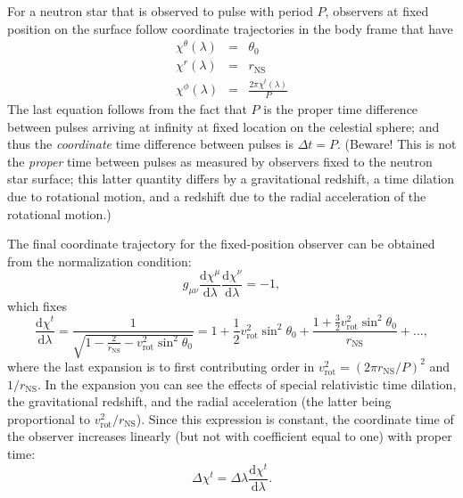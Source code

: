\documentclass[modern]{aastex631}
\newcommand{\dd}{\mathrm{d}}
\newcommand{\rNS}{r_\mathrm{NS}}
\newcommand{\vRot}{v_\mathrm{rot}}
\begin{document}
For a neutron star that is observed to pulse with period $P$, observers at fixed
position on the surface follow coordinate trajectories in the body frame that
have 
\begin{eqnarray}
    \chi^\theta\left( \lambda \right) & = & \theta_0 \\
    \chi^r\left( \lambda \right) & = & \rNS \\
    \chi^\phi\left(\lambda \right) & = & \frac{2 \pi \chi^t\left(\lambda \right)}{P}
\end{eqnarray}
The last equation follows from the fact that $P$ is the proper time difference
between pulses arriving at infinity at fixed location on the celestial sphere;
and thus the \emph{coordinate} time difference between pulses is $\Delta t = P$.
(Beware!  This is not the \emph{proper} time between pulses as measured by
observers fixed to the neutron star surface; this latter quantity differs by a
gravitational redshift, a time dilation due to rotational motion, and a redshift
due to the radial acceleration of the rotational motion.)

The final coordinate trajectory for the fixed-position observer can be obtained
from the normalization condition:
\begin{equation}
    g_{\mu\nu} \frac{\dd \chi^\mu}{\dd \lambda} \frac{\dd \chi^\nu}{\dd \lambda} = -1,
\end{equation}
which fixes 
\begin{equation}
    \frac{\dd \chi^t}{\dd \lambda} = \frac{1}{\sqrt{1 - \frac{2}{\rNS} - \vRot^2 \sin^2 \theta_0}} = 1 + \frac{1}{2}  \vRot^2 \sin^2 \theta_0 + \frac{1 + \frac{3}{2} \vRot^2 \sin^2 \theta_0}{\rNS} + \ldots,
\end{equation}
where the last expansion is to first contributing order in $\vRot^2 = \left( 2
\pi \rNS / P \right)^2$ and $1/\rNS$.  In the expansion you can see the effects
of special relativistic time dilation, the gravitational redshift, and the
radial acceleration (the latter being proportional to $\vRot^2 / \rNS$).  Since
this expression is constant, the coordinate time of the observer increases
linearly (but not with coefficient equal to one) with proper time:
\begin{equation}
    \Delta \chi^t = \Delta \lambda \frac{\dd \chi^t}{\dd \lambda}.
\end{equation}
\end{document}
